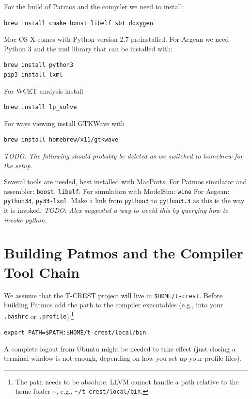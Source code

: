 \documentclass[a4paper,fontsize=10pt,twoside,DIV15,BCOR12mm,headinclude=true,footinclude=false,pagesize,bibtotoc]{scrbook}
\newcommand{\code}[1]{{\texttt{#1}}}
\newcommand{\todo}[1]{{\emph{TODO: #1}}}
\begin{document}
For the build of Patmos and the compiler we need to install:

\begin{verbatim}
brew install cmake boost libelf sbt doxygen
\end{verbatim}

Mac OS X comes with Python version 2.7 preinstalled. For Aegean
we need Python 3 and the xml library that can be installed with:

\begin{verbatim}
brew install python3
pip3 install lxml
\end{verbatim}

For WCET analysis install

\begin{verbatim}
brew install lp_solve
\end{verbatim}

For wave viewing install GTKWave with

\begin{verbatim}
brew install homebrew/x11/gtkwave
\end{verbatim}

\todo{The following should probably be deleted as we switched to homebrew for the setup.}

Several tools are needed, best installed with MacPorts. For Patmos simulator and assembler:
\code{boost}, \code{libelf}.
For simulation with ModelSim: \code{wine}
For Aegean: \code{python33}, \code{py33-lxml}. Make a link from \code{python3} to \code{python3.3} as this is the way it is invoked.
\todo{Alex suggested a way to avoid this by querying how to invoke python.}

\section{Building Patmos and the Compiler Tool Chain}
\label{sec:build:compiler}

We assume that the T-CREST project will live in \code{\$HOME/t-crest}.
Before building Patmos add the path
to the compiler executables (e.g., into your \code{.bashrc} or
\code{.profile}):\footnote{The path needs to be absolute. LLVM cannot handle
a path relative to the home folder \textasciitilde{}, e.g., \code{\textasciitilde{}/t-crest/local/bin}.}

\begin{verbatim}
export PATH=$PATH:$HOME/t-crest/local/bin
\end{verbatim}

A complete logout from Ubuntu might be needed to take effect (just closing
a terminal window is not enough, depending on how you set up your profile files).
\end{document}
